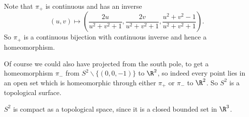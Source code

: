 \begin{example}
\begin{center}
    \end{center}

    Note that $\pi_{+}$ is continuous and has an inverse
    $$
    (u, v) \mapsto \left(\frac{2u}{u^2 + v^2 + 1}, \frac{2v}{u^2 + v^2 + 1}, \frac{u^2 + v^2 - 1}{u^2 + v^2 + 1}\right).
    $$
    So $\pi_+$ is a continuous bijection with continuous inverse and hence a homeomorphism.

    Of course we could also have projected from the south pole, to get a homeomorphism $\pi_-$ from $S^2 \backslash \{(0, 0, -1)\}$ to $\R^2$, so indeed every point lies in an open set which is homeomorphic through either $\pi_+$ or $\pi_-$ to $\R^2$. So $S^2$ is a topological surface.
\end{example}

\begin{remark}
    $S^2$ is compact as a topological space, since it is a closed bounded set in $\R^3$.
\end{remark}

